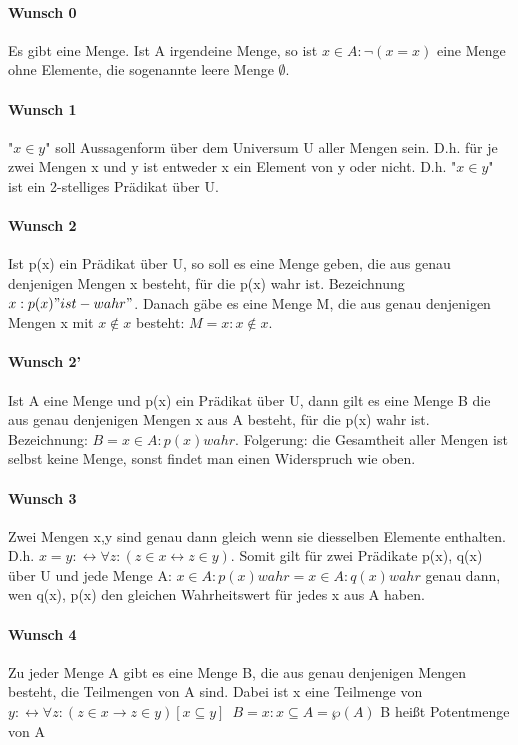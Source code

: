 \documentclass[10pt,landscape]{article}
\begin{document}
\begin{multicols}{3}
\paragraph{Wunsch 0}
Es gibt eine Menge. Ist A irgendeine Menge, so ist ${x \in A: \neg (x=x)}$ eine Menge ohne Elemente, die sogenannte leere Menge $\emptyset$.

\paragraph{Wunsch 1}
"$x\in y$" soll Aussagenform über dem Universum U aller Mengen sein. D.h. für je zwei Mengen x und y ist entweder x ein Element von y oder nicht. D.h. "$x\in y$" ist ein 2-stelliges Prädikat über U.

\paragraph{Wunsch 2}
Ist p(x) ein Prädikat über U, so soll es eine Menge geben, die aus genau denjenigen Mengen x besteht, für die p(x) wahr ist. Bezeichnung ${x:p(x) "ist-wahr" }$.
Danach gäbe es eine Menge M, die aus genau denjenigen Mengen x mit $x\not \in x$ besteht: $M={x:x\not \in x}$.

\paragraph{Wunsch 2'}
Ist A eine Menge und p(x) ein Prädikat über U, dann gilt es eine Menge B die aus genau denjenigen Mengen x aus A besteht, für die p(x) wahr ist. Bezeichnung: $B={x\in A:p(x) wahr}$.
Folgerung: die Gesamtheit aller Mengen ist selbst keine Menge, sonst findet man einen Widerspruch wie oben.

\paragraph{Wunsch 3}
Zwei Mengen x,y sind genau dann gleich wenn sie diesselben Elemente enthalten. D.h. $x=y: \leftrightarrow \forall z:(z\in x \leftrightarrow z\in y)$. Somit gilt für zwei Prädikate p(x), q(x) über U und jede Menge A: ${x\in A: p(x) wahr} = {x\in A: q(x) wahr}$ genau dann, wen q(x), p(x) den gleichen Wahrheitswert für jedes x aus A haben.

\paragraph{Wunsch 4}
Zu jeder Menge A gibt es eine Menge B, die aus genau denjenigen Mengen besteht, die Teilmengen von A sind. Dabei ist x eine Teilmenge von $y: \leftrightarrow \forall z:(z\in x \rightarrow z \in y) [x \subseteq y]$\
$B={x:x\subseteq A}=\wp(A)$ B heißt Potentmenge von A\


\end{multicols}
\end{document}
